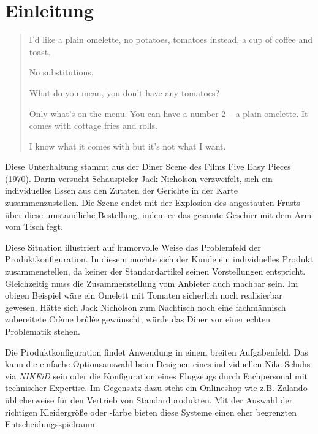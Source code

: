 \documentclass[11pt, a4paper, titlepage, listof=totoc, bibliography=totoc, index=totoc, twoside, openright, headings=normal, draft]{scrreprt}
\begin{document}






%





\chapter{Einleitung}
\begin{quote}
\glqq I'd like a plain omelette, no potatoes, tomatoes instead, a cup of coffee and toast.\grqq{}
\begin{addmargin}[25pt]{0pt} 
\glqq No substitutions.\grqq{}
\end{addmargin}
\glqq What do you mean, you don't have any tomatoes?\grqq{}
\begin{addmargin}[25pt]{0pt} 
\glqq Only what's on the menu. You can have a number 2 -- a plain omelette. It comes with cottage fries and rolls.\grqq{}
\end{addmargin}
\glqq I know what it comes with but it's not what I want.\grqq{}
\end{quote}
Diese Unterhaltung stammt aus der \glqq Diner Scene\grqq{} des Films \glqq Five Easy Pieces\grqq{} (1970). Darin versucht Schauspieler Jack Nicholson verzweifelt, sich ein individuelles Essen aus den Zutaten der Gerichte in der Karte zusammenzustellen. Die Szene endet mit der Explosion des angestauten Frusts über diese umständliche Bestellung, indem er das gesamte Geschirr mit dem Arm vom Tisch fegt.

Diese Situation illustriert auf humorvolle Weise das Problemfeld der Produktkonfiguration. In diesem möchte sich der Kunde ein individuelles Produkt zusammenstellen, da keiner der Standardartikel seinen Vorstellungen entspricht. Gleichzeitig muss die Zusammenstellung vom Anbieter auch machbar sein. Im obigen Beispiel wäre ein Omelett mit Tomaten sicherlich noch realisierbar gewesen. Hätte sich Jack Nicholson zum Nachtisch noch eine fachmännisch zubereitete Crème brûlée gewünscht, würde das Diner vor einer echten Problematik stehen.

Die Produktkonfiguration findet Anwendung in einem breiten Aufgabenfeld. Das kann die einfache Optionsauswahl beim Designen eines individuellen Nike-Schuhs via \emph{NIKEiD} sein oder die Konfiguration eines Flugzeugs durch Fachpersonal mit technischer Expertise. Im Gegensatz dazu steht ein Onlineshop wie z.B. Zalando üblicherweise für den Vertrieb von Standardprodukten. Mit der Auswahl der richtigen Kleidergröße oder -farbe bieten diese Systeme einen eher begrenzten Entscheidungsspielraum.
\end{document}
